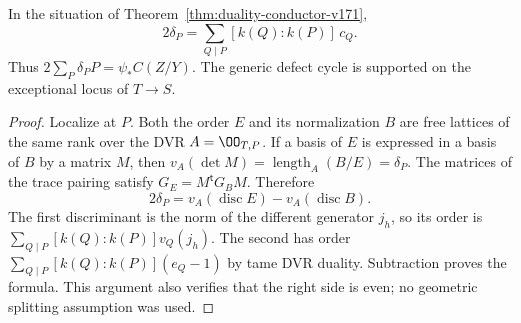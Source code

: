 \begin{corollary}\label{cor:defect-cycle-v171}
In the situation of Theorem~\ref{thm:duality-conductor-v171},
\begin{equation}\label{eq:defect-cycle-v171}
 2\delta_P=\sum_{Q\mid P}[k(Q):k(P)]\,c_Q.
\end{equation}
Thus $2\sum_P\delta_PP=\psi_*C(Z/Y)$. The generic defect cycle is
supported on the exceptional locus of $T\to S$.
\end{corollary}
\begin{proof}
Localize at $P$. Both the order $E$ and its normalization $B$ are free
lattices of the same rank over the DVR $A=\OO_{T,P}$. If a basis of
$E$ is expressed in a basis of $B$ by a matrix $M$, then
$v_A(\det M)=\operatorname{length}_A(B/E)=\delta_P$.
The matrices of the trace pairing satisfy $G_E=M^{\mathsf t}G_BM$.
Therefore
\[
 2\delta_P=v_A(\operatorname{disc}E)-v_A(\operatorname{disc}B).
\]
The first discriminant is the norm of the different generator $j_h$,
so its order is $\sum_{Q\mid P}[k(Q):k(P)]v_Q(j_h)$. The second has
order $\sum_{Q\mid P}[k(Q):k(P)](e_Q-1)$ by tame DVR duality.
Subtraction proves the formula. This argument also verifies that the
right side is even; no geometric splitting assumption was used.
\end{proof}

